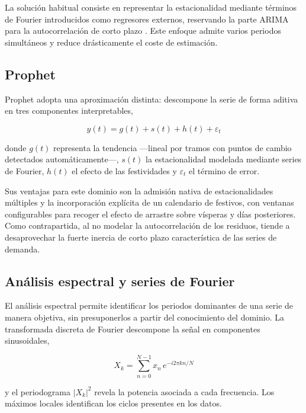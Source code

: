 La solución habitual consiste en representar la estacionalidad mediante términos
de Fourier introducidos como regresores externos, reservando la parte ARIMA para
la autocorrelación de corto plazo \parencite{hyndman2021}. Este enfoque admite
varios periodos simultáneos y reduce drásticamente el coste de estimación.

\subsection{Prophet}

Prophet \parencite{taylor2018prophet} adopta una aproximación distinta:
descompone la serie de forma aditiva en tres componentes interpretables,

\begin{equation}
y(t) = g(t) + s(t) + h(t) + \varepsilon_t
\end{equation}

donde $g(t)$ representa la tendencia —lineal por tramos con puntos de cambio
detectados automáticamente—, $s(t)$ la estacionalidad modelada mediante series de
Fourier, $h(t)$ el efecto de las festividades y $\varepsilon_t$ el término de
error.

Sus ventajas para este dominio son la admisión nativa de estacionalidades
múltiples y la incorporación explícita de un calendario de festivos, con ventanas
configurables para recoger el efecto de arrastre sobre vísperas y días
posteriores. Como contrapartida, al no modelar la autocorrelación de los residuos,
tiende a desaprovechar la fuerte inercia de corto plazo característica de las
series de demanda.

\subsection{Análisis espectral y series de Fourier}

El análisis espectral permite identificar los periodos dominantes de una serie de
manera objetiva, sin presuponerlos a partir del conocimiento del dominio. La
transformada discreta de Fourier descompone la señal en componentes sinusoidales,

\begin{equation}
X_k = \sum_{n=0}^{N-1} x_n \, e^{-i 2\pi k n / N}
\end{equation}

y el periodograma $|X_k|^2$ revela la potencia asociada a cada frecuencia. Los
máximos locales identifican los ciclos presentes en los datos.

